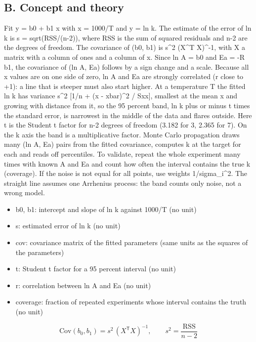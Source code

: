 \documentclass[11pt,a4paper]{article}
\begin{document}
\subsection*{B. Concept and theory}
Fit y = b0 + b1 x with x = 1000/T and y = ln k. The estimate of the error of ln k is s = sqrt(RSS/(n-2)), where RSS is the sum of squared residuals and n-2 are the degrees of freedom. The covariance of (b0, b1) is s\textasciicircum{}2 (X\textasciicircum{}T X)\textasciicircum{}-1, with X a matrix with a column of ones and a column of x. Since ln A = b0 and Ea = -R b1, the covariance of (ln A, Ea) follows by a sign change and a scale. Because all x values are on one side of zero, ln A and Ea are strongly correlated (r close to +1): a line that is steeper must also start higher. At a temperature T the fitted ln k has variance s\textasciicircum{}2 [1/n + (x - xbar)\textasciicircum{}2 / Sxx], smallest at the mean x and growing with distance from it, so the 95 percent band, ln k plus or minus t times the standard error, is narrowest in the middle of the data and flares outside. Here t is the Student t factor for n-2 degrees of freedom (3.182 for 3, 2.365 for 7). On the k axis the band is a multiplicative factor. Monte Carlo propagation draws many (ln A, Ea) pairs from the fitted covariance, computes k at the target for each and reads off percentiles. To validate, repeat the whole experiment many times with known A and Ea and count how often the interval contains the true k (coverage). If the noise is not equal for all points, use weights 1/sigma\_i\textasciicircum{}2. The straight line assumes one Arrhenius process: the band counts only noise, not a wrong model.

\begin{itemize}[nosep]
\item b0, b1: intercept and slope of ln k against 1000/T (no unit)
\item s: estimated error of ln k (no unit)
\item cov: covariance matrix of the fitted parameters (same units as the squares of the parameters)
\item t: Student t factor for a 95 percent interval (no unit)
\item r: correlation between ln A and Ea (no unit)
\item coverage: fraction of repeated experiments whose interval contains the truth (no unit)
\end{itemize}

\begin{equation*}
\mathrm{Cov}(b_0,b_1)=s^2\,(X^{\mathsf T}X)^{-1},\qquad s^2=\frac{\mathrm{RSS}}{n-2}
\end{equation*}
\end{document}

